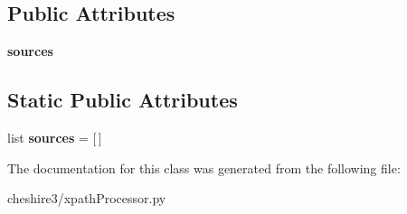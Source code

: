 \subsection*{Public Attributes}
\begin{DoxyCompactItemize}
\item 
\hypertarget{classcheshire3_1_1xpath_processor_1_1_simple_x_path_processor_a6cbf8b7bc3942a433308786c71e2b535}{{\bfseries sources}}\label{classcheshire3_1_1xpath_processor_1_1_simple_x_path_processor_a6cbf8b7bc3942a433308786c71e2b535}

\end{DoxyCompactItemize}
\subsection*{Static Public Attributes}
\begin{DoxyCompactItemize}
\item 
\hypertarget{classcheshire3_1_1xpath_processor_1_1_simple_x_path_processor_aad5b2d6b4ee8755f92a1116f04a0a92d}{list {\bfseries sources} = \mbox{[}$\,$\mbox{]}}\label{classcheshire3_1_1xpath_processor_1_1_simple_x_path_processor_aad5b2d6b4ee8755f92a1116f04a0a92d}

\end{DoxyCompactItemize}


The documentation for this class was generated from the following file\-:\begin{DoxyCompactItemize}
\item 
cheshire3/xpath\-Processor.\-py\end{DoxyCompactItemize}
